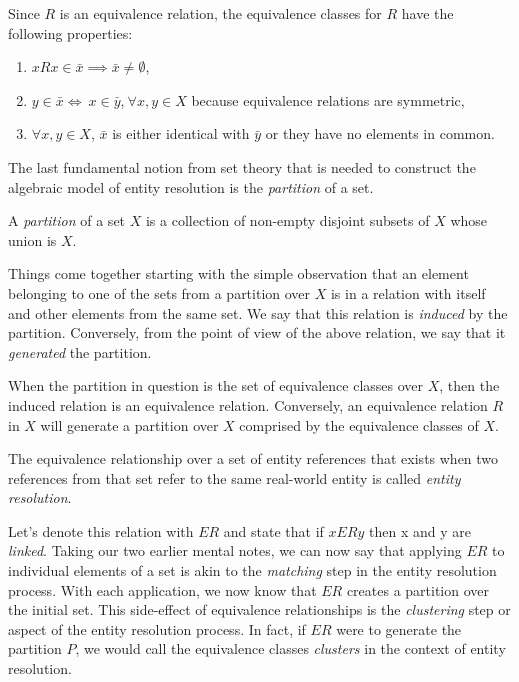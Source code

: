 \documentclass[11pt]{article}
\begin{document}
    Since $R$ is an equivalence relation, the equivalence classes for $R$ have the
    following properties\cite{hoffman1971linear}:
    \begin{enumerate}
        \item $xRx \in \bar{x} \implies \bar{x} \neq \emptyset$,
        \item $y\in\bar{x}\iff~x\in\bar{y}$,$~\forall x,y \in X$ because
        equivalence relations are symmetric,
        \item $\forall x,y \in X$, $\bar{x}$ is either identical with $\bar{y}$
        or they have no elements in common\cite{hoffman1971linear,Tal11}.
    \end{enumerate}
    
    The last fundamental notion from set theory that is needed to construct the
    algebraic model of entity resolution is the \textit{partition} of a set.

    \begin{defn}
        A \textit{partition} of a set $X$ is a collection of non-empty disjoint
        subsets of $X$ whose union is $X$\cite{halmos1960naive,Tal11}.
    \end{defn}

    Things come together starting with the simple observation that an element
    belonging to one of the sets from a partition over $X$ is in a relation with
    itself and other elements from the same set.
    We say that this relation is \textit{induced} by the partition.
    Conversely, from the point of view of the above relation, we say that it
    \textit{generated} the partition.

    When the partition in question is the set of equivalence classes over $X$,
    then the induced relation is an equivalence relation.
    Conversely, an equivalence relation $R$ in $X$ will generate a partition
    over $X$ comprised by the equivalence classes of $X$\cite{halmos1960naive,
    Tal11}.

    \begin{defn}
        The equivalence relationship over a set of entity references that exists
        when two references from that set refer to the same real-world entity is
        called \textit{entity resolution}.
    \end{defn}

    Let's denote this relation with $ER$ and state that if $xERy$ then x and y
    are \textit{linked}\cite{Tal11}.
    Taking our two earlier mental notes, we can now say that applying $ER$ to
    individual elements of a set is akin to the \textit{matching} step in the
    entity resolution process.
    With each application, we now know that $ER$ creates a partition over the
    initial set.
    This side-effect of equivalence relationships is the \textit{clustering}
    step or aspect of the entity resolution process.
    In fact, if $ER$ were to generate the partition $P$, we would call the
    equivalence classes \textit{clusters} in the context of entity resolution.
\end{document}
